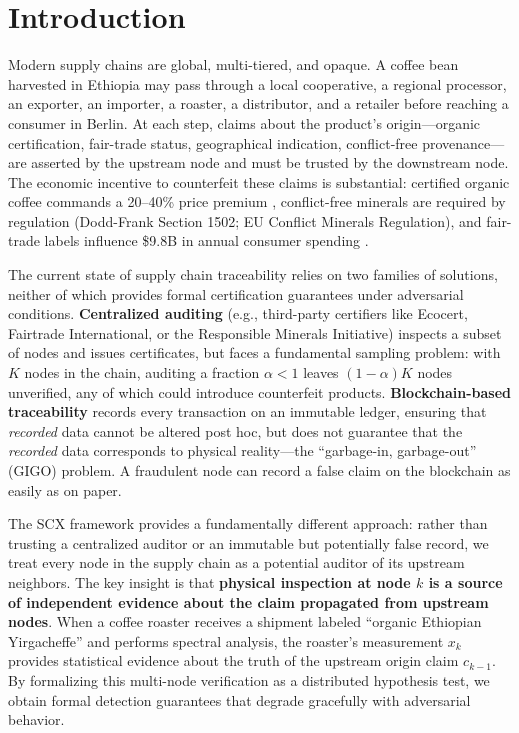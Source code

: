 \documentclass[11pt,a4paper]{article}
\theoremstyle{definition}
\theoremstyle{remark}
\begin{document}
\section{Introduction }

Modern supply chains are global, multi-tiered, and opaque. A coffee bean harvested in Ethiopia may pass through a local cooperative, a regional processor, an exporter, an importer, a roaster, a distributor, and a retailer before reaching a consumer in Berlin. At each step, claims about the product's origin---organic certification, fair-trade status, geographical indication, conflict-free provenance---are asserted by the upstream node and must be trusted by the downstream node. The economic incentive to counterfeit these claims is substantial: certified organic coffee commands a 20--40\% price premium \cite{jena2012organic}, conflict-free minerals are required by regulation (Dodd-Frank Section 1502; EU Conflict Minerals Regulation), and fair-trade labels influence \$9.8B in annual consumer spending \cite{fairtrade2023}.

The current state of supply chain traceability relies on two families of solutions, neither of which provides formal certification guarantees under adversarial conditions. \textbf{Centralized auditing} (e.g., third-party certifiers like Ecocert, Fairtrade International, or the Responsible Minerals Initiative) inspects a subset of nodes and issues certificates, but faces a fundamental sampling problem: with $K$ nodes in the chain, auditing a fraction $\alpha < 1$ leaves $(1-\alpha)K$ nodes unverified, any of which could introduce counterfeit products. \textbf{Blockchain-based traceability} \cite{tian2016agri,tse2020blockchain} records every transaction on an immutable ledger, ensuring that \textit{recorded} data cannot be altered post hoc, but does not guarantee that the \textit{recorded} data corresponds to physical reality---the ``garbage-in, garbage-out'' (GIGO) problem. A fraudulent node can record a false claim on the blockchain as easily as on paper.

The SCX framework \cite{SCX2025} provides a fundamentally different approach: rather than trusting a centralized auditor or an immutable but potentially false record, we treat every node in the supply chain as a potential auditor of its upstream neighbors. The key insight is that \textbf{physical inspection at node $k$ is a source of independent evidence about the claim propagated from upstream nodes}. When a coffee roaster receives a shipment labeled ``organic Ethiopian Yirgacheffe'' and performs spectral analysis, the roaster's measurement $x_k$ provides statistical evidence about the truth of the upstream origin claim $c_{k-1}$. By formalizing this multi-node verification as a distributed hypothesis test, we obtain formal detection guarantees that degrade gracefully with adversarial behavior.
\end{document}
